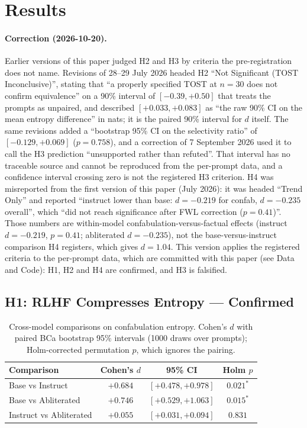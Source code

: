 \documentclass[11pt,a4paper]{article}
\begin{document}
\section{Results}
\label{sec:results}

\paragraph{Correction (2026-10-20).}
Earlier versions of this paper judged H2 and H3 by criteria the
pre-registration does not name. Revisions of 28--29 July 2026 headed H2
``Not Significant (TOST Inconclusive)'', stating that ``a properly
specified TOST at $n{=}30$ does not confirm equivalence'' on a 90\%
interval of $[-0.39, +0.50]$ that treats the prompts as unpaired, and
described $[+0.033, +0.083]$ as ``the raw 90\% CI on the mean entropy
difference'' in nats; it is the paired 90\% interval for $d$ itself.
The same revisions added a ``bootstrap 95\% CI on the selectivity
ratio'' of $[-0.129, +0.069]$ ($p{=}0.758$), and a correction of 7
September 2026 used it to call the H3 prediction ``unsupported rather
than refuted''. That interval has no traceable source and cannot be
reproduced from the per-prompt data, and a confidence interval crossing
zero is not the registered H3 criterion. H4 was misreported from the
first version of this paper (July 2026): it was headed ``Trend Only''
and reported ``instruct lower than base: $d{=}-0.219$ for confab,
$d{=}-0.235$ overall'', which ``did not reach significance after FWL
correction ($p{=}0.41$)''. Those numbers are within-model
confabulation-versus-factual effects (instruct $d = -0.219$,
$p = 0.41$; abliterated $d = -0.235$), not the base-versus-instruct
comparison H4 registers, which gives $d = 1.04$. This version applies
the registered criteria to the per-prompt data, which are committed
with this paper (see Data and Code): H1, H2 and H4 are confirmed, and
H3 is falsified.

\subsection{H1: RLHF Compresses Entropy --- Confirmed}

\begin{table}[ht]
\centering
\small
\caption{Cross-model comparisons on confabulation entropy. Cohen's
  $d$ with paired BCa bootstrap 95\% intervals (1000 draws over
  prompts); Holm-corrected permutation $p$, which ignores the pairing.}
\label{tab:crossmodel}
\begin{tabular}{lccc}
\toprule
\textbf{Comparison} & \textbf{Cohen's $d$} & \textbf{95\% CI} & \textbf{Holm $p$} \\
\midrule
Base vs Instruct & $+0.684$ & $[+0.478, +0.978]$ & $0.021^*$ \\
Base vs Abliterated & $+0.746$ & $[+0.529, +1.063]$ & $0.015^*$ \\
Instruct vs Abliterated & $+0.055$ & $[+0.031, +0.094]$ & $0.831$ \\
\bottomrule
\end{tabular}
\end{table}
\end{document}
